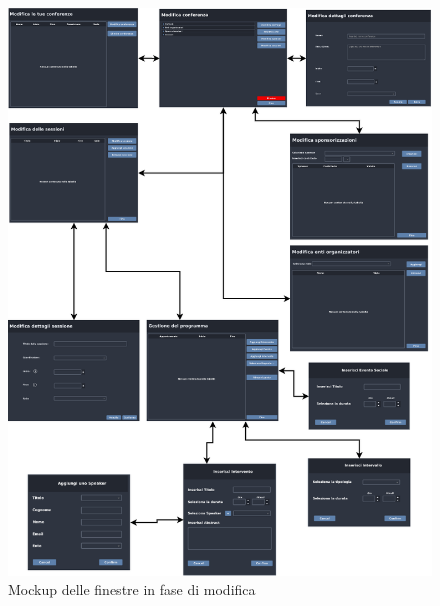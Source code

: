 \begin{figure}[h!]
	\centering
	\includegraphics[scale=0.57]{Immagini/Mockup/Edit/Flow_Edit.png}
	\caption{Mockup delle finestre in fase di modifica}
\end{figure}

